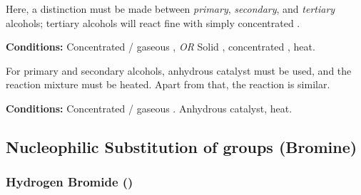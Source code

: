 				Here, a distinction must be made between \textit{primary}, \textit{secondary}, and \textit{tertiary} alcohols;
				tertiary alcohols will react fine with simply concentrated .

				\vspace{1.5em}
				\vbox{\textbf{Conditions:}	\tabto{35mm}Concentrated  / gaseous , \textit{OR}
											\tabto{35mm}Solid , concentrated , heat.}



				For primary and secondary alcohols, anhydrous  catalyst must be used, and the reaction mixture
				must be heated. Apart from that, the reaction is similar.

				\vspace{1.5em}
				\vbox{\textbf{Conditions:}	\tabto{35mm}Concentrated  / gaseous .
											\tabto{35mm}Anhydrous  catalyst, heat.}


		\pagebreak
		\subsection{Nucleophilic Substitution of  groups (Bromine)}

			\subsubsection{Hydrogen Bromide ()}

